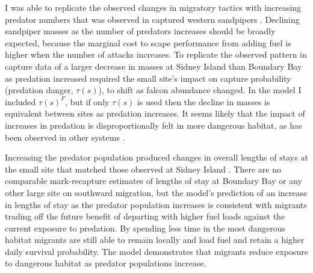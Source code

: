 
I was able to replicate the observed changes in migratory tactics with increasing predator numbers that was observed in captured western sandpipers \citep{ydenberg_western_2004}. Declining sandpiper masses as the number of predators increases should be broadly expected, because the marginal cost to scape performance from adding fuel is higher when the number of attacks increases. To replicate the observed pattern in capture data of a larger decrease in masses at Sidney Island than Boundary Bay as predation increased required the small site's impact on capture probability (predation danger, $\tau(s)$), to shift as falcon abundance changed. In the model I included $\tau(s)^F$, but if only $\tau(s)$ is used then the decline in masses is equivalent between sites as predation increases. It seems likely that the impact of increases in predation is disproportionally felt in more dangerous habitat, as has been observed in other systems \citep{Brown2004}. 

Increasing the predator population produced changes in overall lengths of stays at the small site that matched those observed at Sidney Island \citep{ydenberg_western_2004}. There are no comparable mark-recapture estimates of lengths of stay at Boundary Bay or any other large site on southward migration, but the model's prediction of an increase in lengths of stay as the predator population increases is consistent with migrants trading off the future benefit of departing with higher fuel loads against the current exposure to predation.  By spending less time in the most dangerous habitat migrants are still able to remain locally and load fuel and retain a higher daily survival probability. The model demonstrates that migrants reduce exposure to dangerous habitat as predator populations increase.

